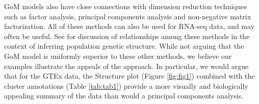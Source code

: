 


GoM models also have close connections with dimension reduction techniques such as factor analysis, principal components analysis and non-negative matrix factorization. All of these methods can also be used for RNA-seq data, and may often be useful. See  \cite{Engelhardt2010} for discussion of 
relationships among these methods in the context of inferring population genetic structure. While not arguing that the GoM model
is uniformly superior to these other methods, we believe our examples illustrate the appeals of the approach. In particular, we would argue that for the GTEx data, 
the Structure plot (Figure \ref{fig:fig1}) combined with the cluster annotations (Table \ref{tab:tab1}) provide a more visually and biologically appealing summary of the data
than would a principal components analysis.

